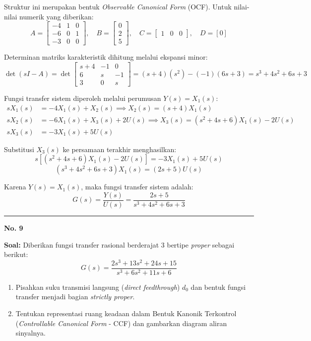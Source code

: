 \documentclass[11pt,a4paper]{article}
\begin{document}
Struktur ini merupakan bentuk \textit{Observable Canonical Form} (OCF). Untuk nilai-nilai numerik yang diberikan:
$$A = \begin{bmatrix} -4 & 1 & 0 \\ -6 & 0 & 1 \\ -3 & 0 & 0 \end{bmatrix}, \quad B = \begin{bmatrix} 0 \\ 2 \\ 5 \end{bmatrix}, \quad C = \begin{bmatrix} 1 & 0 & 0 \end{bmatrix}, \quad D = [0]$$

Determinan matriks karakteristik dihitung melalui ekspansi minor:
$$\det(sI - A) = \det \begin{bmatrix} s+4 & -1 & 0 \\ 6 & s & -1 \\ 3 & 0 & s \end{bmatrix} = (s+4)(s^2) - (-1)(6s + 3) = s^3 + 4s^2 + 6s + 3$$

Fungsi transfer sistem diperoleh melalui perumusan $Y(s) = X_1(s)$:
\begin{align*}
    s X_1(s) &= -4 X_1(s) + X_2(s) \implies X_2(s) = (s+4) X_1(s) \\
    s X_2(s) &= -6 X_1(s) + X_3(s) + 2 U(s) \implies X_3(s) = (s^2 + 4s + 6) X_1(s) - 2 U(s) \\
    s X_3(s) &= -3 X_1(s) + 5 U(s)
\end{align*}

Substitusi $X_3(s)$ ke persamaan terakhir menghasilkan:
$$s [(s^2 + 4s + 6) X_1(s) - 2 U(s)] = -3 X_1(s) + 5 U(s)$$
$$(s^3 + 4s^2 + 6s + 3) X_1(s) = (2s + 5) U(s)$$

Karena $Y(s) = X_1(s)$, maka fungsi transfer sistem adalah:
$$G(s) = \frac{Y(s)}{U(s)} = \frac{2s + 5}{s^3 + 4s^2 + 6s + 3}$$

\vspace{12pt}
\hrule
\vspace{10pt}

\textbf{\large No. 9}

\textbf{Soal:}  
Diberikan fungsi transfer rasional berderajat 3 bertipe \textit{proper} sebagai berikut:
$$G(s) = \frac{2s^3 + 13s^2 + 24s + 15}{s^3 + 6s^2 + 11s + 6}$$
\begin{enumerate}[label=(\alph*)]
    \item Pisahkan suku transmisi langsung (\textit{direct feedthrough}) $d_0$ dan bentuk fungsi transfer menjadi bagian \textit{strictly proper}.
    \item Tentukan representasi ruang keadaan dalam Bentuk Kanonik Terkontrol (\textit{Controllable Canonical Form} - CCF) dan gambarkan diagram aliran sinyalnya.
\end{enumerate}
\end{document}
